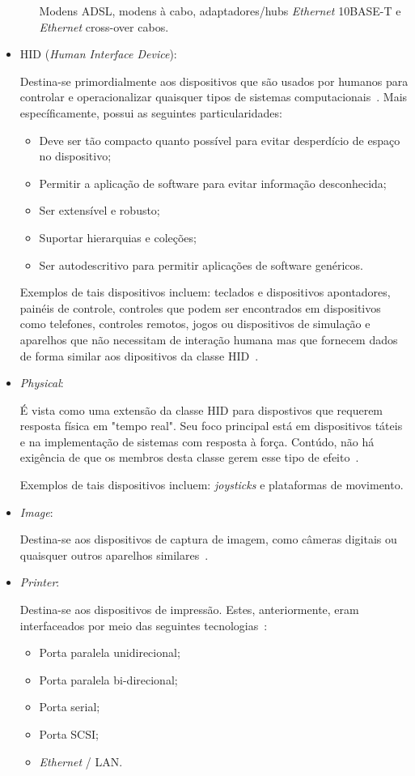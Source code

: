 \begin{itemize}
\begin{itemize}
		Modens ADSL, modens à cabo, adaptadores/hubs \emph{Ethernet} 10BASE-T e \emph{Ethernet} cross-over cabos.
	\end{itemize}
	\item HID (\emph{Human Interface Device}): 

	Destina-se primordialmente aos dispositivos que são usados por humanos para controlar e operacionalizar quaisquer tipos de sistemas computacionais~\cite{hid}. Mais específicamente, possui as seguintes particularidades:
	\begin{itemize}
		\item Deve ser tão compacto quanto possível para evitar desperdício de espaço no dispositivo;
		\item Permitir a aplicação de software para evitar informação desconhecida;
		\item Ser extensível e robusto;
		\item Suportar hierarquias e coleções;
		\item Ser autodescritivo para permitir aplicações de software genéricos.
	\end{itemize}

	Exemplos de tais dispositivos incluem: teclados e dispositivos apontadores, painéis de controle, controles que podem ser encontrados em dispositivos como telefones, controles remotos, jogos ou dispositivos de simulação e aparelhos que não necessitam de interação humana mas que fornecem dados de forma similar aos dipositivos da classe HID~\cite{hid}.
	\item \emph{Physical}: 

	É vista como uma extensão da classe HID para dispostivos que requerem resposta física em "tempo real". Seu foco principal está em dispositivos táteis e na implementação de sistemas com resposta à força. Contúdo, não há exigência de que os membros desta classe gerem esse tipo de efeito~\cite{usbphysicalclass}.

	Exemplos de tais dispositivos incluem: \emph{joysticks} e plataformas de movimento.
	\item \emph{Image}: 

	Destina-se aos dispositivos de captura de imagem, como câmeras digitais ou quaisquer outros aparelhos similares~\cite{usbimageclass}.
	\item \emph{Printer}: 

	Destina-se aos dispositivos de impressão. Estes, anteriormente, eram interfaceados por meio das seguintes tecnologias~\cite{usbprintclass}:
	\begin{itemize}
		\item Porta paralela unidirecional;
		\item Porta paralela bi-direcional;
		\item Porta serial;
		\item Porta SCSI;
		\item \emph{Ethernet} / LAN.
	\end{itemize}


\end{itemize}
